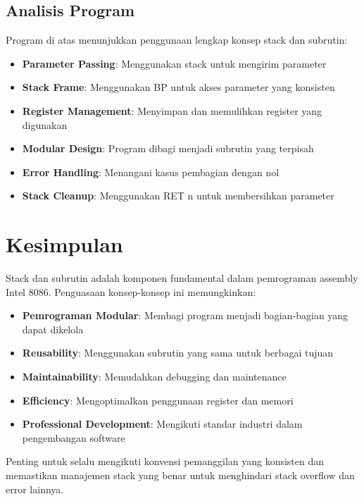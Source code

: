 \documentclass[../main.tex]{subfiles}
\begin{document}
        \subsection{Analisis Program}
            Program di atas menunjukkan penggunaan lengkap konsep stack dan subrutin:

            \begin{itemize}
                \item \textbf{Parameter Passing}: Menggunakan stack untuk mengirim parameter
                \item \textbf{Stack Frame}: Menggunakan BP untuk akses parameter yang konsisten
                \item \textbf{Register Management}: Menyimpan dan memulihkan register yang digunakan
                \item \textbf{Modular Design}: Program dibagi menjadi subrutin yang terpisah
                \item \textbf{Error Handling}: Menangani kasus pembagian dengan nol
                \item \textbf{Stack Cleanup}: Menggunakan RET n untuk membersihkan parameter
            \end{itemize}

    \section{Kesimpulan}
        Stack dan subrutin adalah komponen fundamental dalam pemrograman assembly Intel 8086. Penguasaan konsep-konsep ini memungkinkan:

        \begin{itemize}
            \item \textbf{Pemrograman Modular}: Membagi program menjadi bagian-bagian yang dapat dikelola
            \item \textbf{Reusability}: Menggunakan subrutin yang sama untuk berbagai tujuan
            \item \textbf{Maintainability}: Memudahkan debugging dan maintenance
            \item \textbf{Efficiency}: Mengoptimalkan penggunaan register dan memori
            \item \textbf{Professional Development}: Mengikuti standar industri dalam pengembangan software
        \end{itemize}

        Penting untuk selalu mengikuti konvensi pemanggilan yang konsisten dan memastikan manajemen stack yang benar untuk menghindari stack overflow dan error lainnya.
\end{document}
